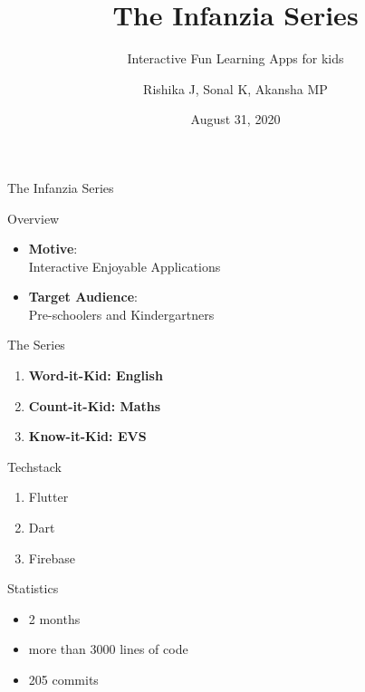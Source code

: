 \documentclass[14pt]{beamer}
\title[Infanzia]{The Infanzia Series}
\subtitle{Interactive Fun Learning Apps for kids}
\author[Team 16]{Rishika J, Sonal K, Akansha MP}
\date{August 31, 2020}
\begin{document}
\begin{frame}
    \titlepage
\end{frame}


\begin{frame}[standout]
    \alert{The Infanzia Series}
\end{frame}


\begin{frame}{Overview}
    \pause
    \begin{itemize}
    \item \textbf{Motive}: \\
            Interactive Enjoyable Applications
        \pause
    \item \textbf{Target Audience}: \\
            Pre-schoolers and Kindergartners
    \end{itemize}
\end{frame}


\begin{frame}[standout]
    \alert{The Series}
\end{frame}


\begin{frame}
    \begin{enumerate}
        \item \textbf{Word-it-Kid: English} \\
    \pause
        \item \textbf{Count-it-Kid: Maths} \\
    \pause
        \item \textbf{Know-it-Kid: EVS} 
    \end{enumerate}
\end{frame}


\begin{frame}{Techstack}
    \pause
    \begin{enumerate}
        \item Flutter
    \pause
        \item Dart
    \pause
        \item Firebase  
    \end{enumerate}
\end{frame}


\begin{frame}{Statistics}
    \pause
    \begin{itemize}
        \item 2 months
            \pause
        \item more than 3000 lines of code
            \pause
        \item 205 commits
    \end{itemize}
\end{frame}
\end{document}
